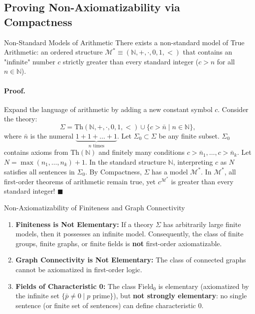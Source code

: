\subsection{Proving Non-Axiomatizability via Compactness}

\begin{propbox}{Non-Standard Models of Arithmetic}
There exists a non-standard model of True Arithmetic: an ordered structure $\mathcal{M}^* \equiv (\mathbb{N}, +, \cdot, 0, 1, <)$ that contains an "infinite" number $c$ strictly greater than every standard integer ($c > n$ for all $n \in \mathbb{N}$).
\end{propbox}
\paragraph{Proof.}
Expand the language of arithmetic by adding a new constant symbol $c$. Consider the theory:
\[
\Sigma = \mathrm{Th}(\mathbb{N}, +, \cdot, 0, 1, <) \cup \{ c > \bar{n} \mid n \in \mathbb{N} \},
\]
where $\bar{n}$ is the numeral $\underbrace{1 + 1 + \dots + 1}_{n \text{ times}}$.
Let $\Sigma_0 \subset \Sigma$ be any finite subset. $\Sigma_0$ contains axioms from $\mathrm{Th}(\mathbb{N})$ and finitely many conditions $c > \bar{n}_1, \dots, c > \bar{n}_k$.
Let $N = \max(n_1, \dots, n_k) + 1$. In the standard structure $\mathbb{N}$, interpreting $c$ as $N$ satisfies all sentences in $\Sigma_0$.
By Compactness, $\Sigma$ has a model $\mathcal{M}^*$. In $\mathcal{M}^*$, all first-order theorems of arithmetic remain true, yet $c^{\mathcal{M}^*}$ is greater than every standard integer! $\blacksquare$

\begin{propbox}{Non-Axiomatizability of Finiteness and Graph Connectivity}
\begin{enumerate}[leftmargin=1.4em,itemsep=3pt]
  \item \textbf{Finiteness is Not Elementary:} If a theory $\Sigma$ has arbitrarily large finite models, then it possesses an infinite model.
  Consequently, the class of finite groups, finite graphs, or finite fields is \textbf{not} first-order axiomatizable.
  \item \textbf{Graph Connectivity is Not Elementary:} The class of connected graphs cannot be axiomatized in first-order logic.
  \item \textbf{Fields of Characteristic 0:} The class $\mathrm{Field}_0$ is elementary (axiomatized by the infinite set $\{ \bar{p} \neq 0 \mid p \text{ prime} \}$), but \textbf{not strongly elementary}: no single sentence (or finite set of sentences) can define characteristic 0.
\end{enumerate}
\end{propbox}

